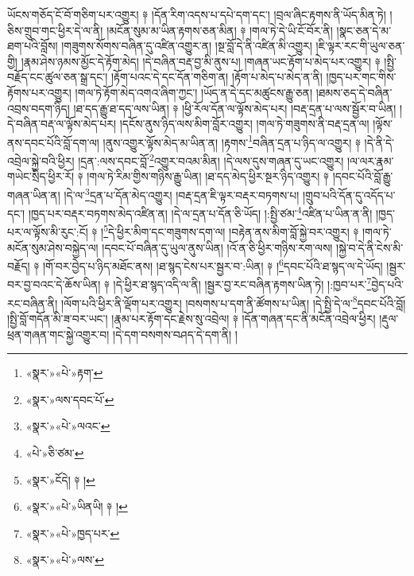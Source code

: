 ཡོངས་གཅོད་ངོ་བོ་གཅིག་པར་འགྱུར། ༈ །དོན་རིག་འདས་པ་དཔེ་དག་དང་། །བྲལ་ཞིང་རྟགས་ནི་ཡོད་མིན་ཏེ། །ཅིས་གྲུབ་གང་ཕྱིར་དེ་ལ་ནི། །མངོན་སུམ་མ་ཡིན་རྟགས་ཅན་མིན། ༈ །གལ་ཏེ་དེ་ཡི་ངོ་བོར་ནི། །སྣང་ཅན་དེ་མ་ཐག་པའི་བློས། །གཟུགས་སོགས་བཞིན་དུ་འཛིན་འགྱུར་ན། །སྔ་བློ་དེ་ནི་འཛིན་མི་འགྱུར། །ཇི་ལྟར་རང་གི་ཡུལ་ཅན་གྱི། །རྣམ་ཤེས་ཉམས་མྱོང་དེ་རྟོག་མེད། །དེ་བཞིན་བརྡ་བྱ་མི་ནུས་པ། །གཞན་ཡང་རྟོག་པ་མེད་པར་འགྱུར། ༈ །སྤྱི་བརྗོད་ངང་ཚུལ་ཅན་སྒྲ་དང་། །རྟོག་པའང་དེ་དང་དོན་གཅིག་ན། །རྟོག་པ་མེད་པ་མེད་ན་ནི། །ཁྱད་པར་གང་གིས་རྟོགས་པར་འགྱུར། །གལ་ཏེ་རྟོག་མེད་འགའ་ཞིག་ཀྱང་། །ཡོད་ན་དེ་དང་མཚུངས་རྒྱུ་ཅན། །ཐམས་ཅད་དེ་བཞིན་འབྲས་བདག་ཉིད། །ཐ་དད་རྒྱུ་ཐ་དད་ལས་ཡིན། ༈ །ཕྱི་རོལ་དོན་ལ་ལྟོས་མེད་པར། །བརྡ་དྲན་པ་ལས་སྦྱོར་བ་ཡིན། །དེ་བཞིན་བརྡ་ལ་ལྟོས་མེད་པར། །དངོས་ནུས་ཉིད་ལས་མིག་བློར་འགྱུར། །གལ་ཏེ་གཟུགས་ནི་བརྡ་དྲན་ལ། །ལྟོས་ནས་དབང་པོའི་བློ་དག་ལ། །ནུས་འགྱུར་ལྟོས་མེད་མ་ཡིན་ན། །རྟགས་\footnote{«སྣར་»«པེ་»རྟག་}བཞིན་དྲན་པ་ཉིད་ལ་འགྱུར། ༈ །དེ་ནི་དེ་འབྲེལ་སྐྱེ་བའི་ཕྱིར། །དྲན་:ལས་དབང་བློ་\footnote{«སྣར་»ལས་དབང་པོ་}འགྱུར་བའམ་མིན། །དེ་ལས་དུས་གཞན་དུ་ཡང་འགྱུར། །ལ་ལར་རྣམ་གཡེང་སྲིད་ཕྱིར་རོ། ༈ །གལ་ཏེ་རིམ་གྱིས་གཉིས་རྒྱུ་ཡིན། །ཐ་དད་མེད་ཕྱིར་སྔར་ཉིད་འགྱུར། ༈ །དབང་པོའི་བློ་རྒྱུ་གཞན་ཡིན་ན། །དེ་ལ་\footnote{«སྣར་»«པེ་»ལའང་}དྲན་པ་དོན་མེད་འགྱུར། །བརྡ་དྲན་ཇི་ལྟར་བརྡར་བཏགས་པ། །གྲུབ་པའི་དོན་དུ་འདོད་པ་དང་། །ཁྱད་པར་བརྡར་བཏགས་མེད་འཛིན་ན། །དེ་ལ་དྲན་པ་དོན་ཅི་ཡོད། །:སྤྱི་ཙམ་\footnote{«པེ་»ཅི་ཙམ་}འཛིན་པ་ཡིན་ན་ནི། །ཁྱད་པར་ལ་ལྟོས་མི་རུང་:ངོ། ༈ །\footnote{«སྣར་»ངོདེ། ༈ །}དེ་ཕྱིར་མིག་དང་གཟུགས་དག་ལ། །བརྟེན་ནས་མིག་བློ་སྐྱེ་བར་འགྱུར། ༈ །གལ་ཏེ་མངོན་སུམ་ཤེས་བསྐྱེད་ལ། །དབང་པོ་བཞིན་དུ་ཡུལ་ནུས་ཡིན། །འོ་ན་ཅི་ཕྱིར་གཉིས་རག་ལས། །སྐྱེ་བ་དེ་ནི་ངེས་མི་བརྗོད། ༈ །གོ་བར་བྱེད་པ་ཉིད་མཐོང་ནས། །ཐ་སྙད་ངེས་པར་སྦྱར་བ་:ཡིན། ༈ །\footnote{«སྣར་»«པེ་»ཡིནཡི། ༈ །}དབང་པོའི་ཐ་སྙད་ལ་དེ་ཡོད། །སྦྱར་བར་བྱ་བའང་དེ་ཆོས་ཡིན། ༈ །དེ་ཕྱིར་ཐ་སྙད་འདི་ལ་ནི། །སྦྱར་བྱ་རང་བཞིན་རྟགས་ཡིན་ཏེ། །:ཁྱབ་པར་\footnote{«སྣར་»«པེ་»ཁྱད་པར་}བྱེད་པའི་རང་བཞིན་ནི། །ལོག་པའི་ཕྱིར་ནི་ལྡོག་པར་འགྱུར། །བསགས་པ་དག་ནི་ཚོགས་པ་ཡིན། །དེ་སྤྱི་དེ་ལ་\footnote{«སྣར་»«པེ་»ལས་}དབང་པོའི་བློ། །སྤྱི་བློ་གདོན་མི་ཟ་བར་ཡང་། །རྣམ་པར་རྟོག་དང་རྗེས་སུ་འབྲེལ། ༈ །དོན་གཞན་དང་ནི་མངོན་འབྲེལ་ཕྱིར། །རྡུལ་ཕྲན་གཞན་གང་སྐྱེ་འགྱུར་བ། །དེ་དག་བསགས་བཤད་དེ་དག་ནི། །
